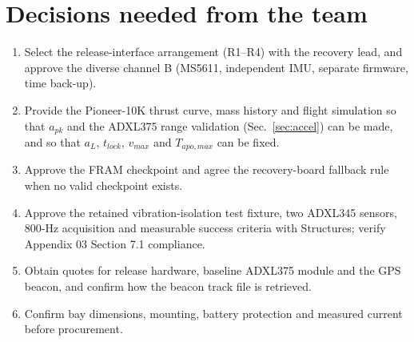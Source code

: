 \section{Decisions needed from the team}
\begin{enumerate}
\item Select the release-interface arrangement (R1--R4) with the recovery lead, and approve the diverse channel B (MS5611, independent IMU, separate firmware, time back-up).
\item Provide the Pioneer-10K thrust curve, mass history and flight simulation so that $a_{pk}$ and the ADXL375 range validation (Sec.~\ref{sec:accel}) can be made, and so that $a_L$, $t_{lock}$, $v_{max}$ and $T_{apo,max}$ can be fixed.
\item Approve the FRAM checkpoint and agree the recovery-board fallback rule when no valid checkpoint exists.
\item Approve the retained vibration-isolation test fixture, two ADXL345 sensors, 800-Hz acquisition and measurable success criteria with Structures; verify Appendix 03 Section 7.1 compliance.
\item Obtain quotes for release hardware, baseline ADXL375 module and the GPS beacon, and confirm how the beacon track file is retrieved.
\item Confirm bay dimensions, mounting, battery protection and measured current before procurement.
\end{enumerate}

\printbibliography[title={References}]
